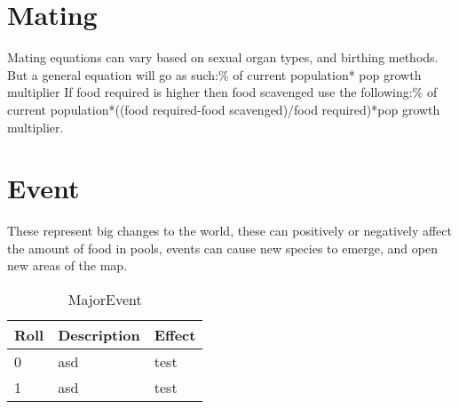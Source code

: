 \section{Mating}
\label{sec:gameplay:Mating}
Mating equations can vary based on sexual organ types, and birthing methods. But a general equation will go as such:\% of current population* pop growth multiplier\newline\newline
If food required is higher then food scavenged use the following:\% of current population*((food required-food scavenged)/food required)*pop growth multiplier.

\section{Event}
\label{sec:gameplay:Event}
These represent big changes to the world, these can positively or negatively affect the amount of food in pools, events can cause new species to emerge, and open new areas of the map.
\begin{table}[h]
	\centering
		\begin{tabular}{|l|l|l|}
		\hline
		Roll & Description & Effect\\
		\hline
		0 & asd & test\\
		\hline	
		1 & asd & test\\
		\hline
		\end{tabular}
	\caption{MajorEvent}
	\label{tab:MajorEvent}
\end{table}
